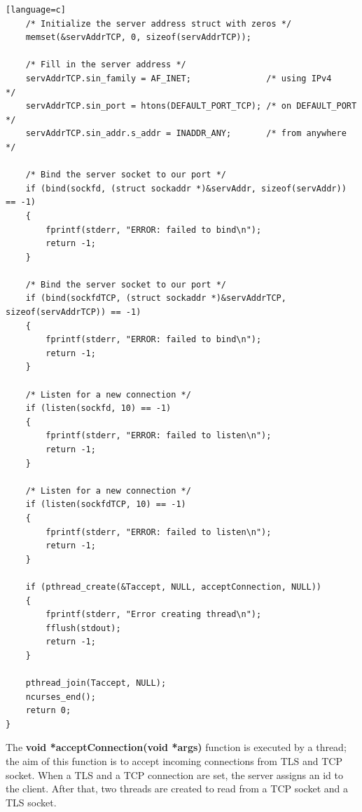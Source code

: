 \documentclass[a4paper,12pt]{article}
\begin{document}
\begin{lstlisting}[caption={int main() of TLS server},captionpos=b][language=c]
    /* Initialize the server address struct with zeros */
    memset(&servAddrTCP, 0, sizeof(servAddrTCP));

    /* Fill in the server address */
    servAddrTCP.sin_family = AF_INET;               /* using IPv4      */
    servAddrTCP.sin_port = htons(DEFAULT_PORT_TCP); /* on DEFAULT_PORT */
    servAddrTCP.sin_addr.s_addr = INADDR_ANY;       /* from anywhere   */

    /* Bind the server socket to our port */
    if (bind(sockfd, (struct sockaddr *)&servAddr, sizeof(servAddr)) == -1)
    {
        fprintf(stderr, "ERROR: failed to bind\n");
        return -1;
    }

    /* Bind the server socket to our port */
    if (bind(sockfdTCP, (struct sockaddr *)&servAddrTCP, sizeof(servAddrTCP)) == -1)
    {
        fprintf(stderr, "ERROR: failed to bind\n");
        return -1;
    }

    /* Listen for a new connection */
    if (listen(sockfd, 10) == -1)
    {
        fprintf(stderr, "ERROR: failed to listen\n");
        return -1;
    }

    /* Listen for a new connection */
    if (listen(sockfdTCP, 10) == -1)
    {
        fprintf(stderr, "ERROR: failed to listen\n");
        return -1;
    }

    if (pthread_create(&Taccept, NULL, acceptConnection, NULL))
    {
        fprintf(stderr, "Error creating thread\n");
        fflush(stdout);
        return -1;
    }

    pthread_join(Taccept, NULL);
    ncurses_end();
    return 0;
}
\end{lstlisting}
The \textbf{void *acceptConnection(void *args)} function is executed by a thread; the aim of this function is to accept incoming connections from TLS and TCP socket. When a TLS and a TCP connection are set, the server assigns an id to the client. After that, two threads are created to read from a TCP socket and a TLS socket.
\end{document}
